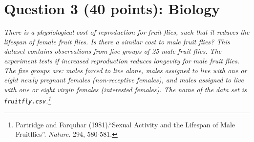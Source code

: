 \documentclass[12pt,letterpaper]{article}
\begin{document}
\newpage
	\section*{Question 3 (40 points): Biology}

\emph{There is a physiological cost of reproduction for fruit flies, such that it reduces the lifespan of female fruit flies.  Is there a similar cost to male fruit flies?  This dataset contains observations from five groups of 25 male fruit flies. The experiment tests if increased reproduction reduces longevity for male fruit flies. The five groups are: males forced to live alone, males assigned to live with one or eight newly pregnant females (non-receptive females), and males assigned to live with one or eight virgin females (interested females). The name of the data set is \texttt{fruitfly.csv}.\footnote{Partridge and Farquhar (1981).``Sexual Activity and the Lifespan of Male Fruitflies''. \textit{Nature}. 294, 580-581.}}
	\vspace{1cm}
\end{document}
